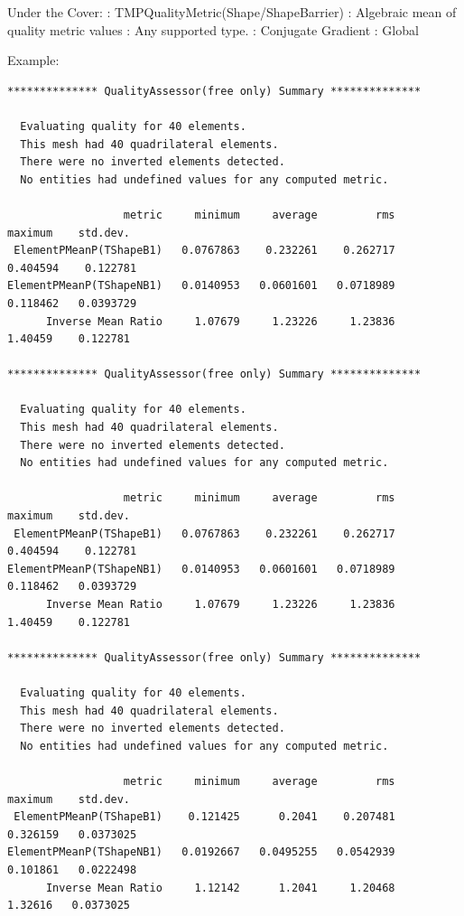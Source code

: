 \noindent Under the Cover: \newline
{}: TMPQualityMetric(Shape/ShapeBarrier) \newline
{}: Algebraic mean of quality metric values \newline
{}: Any supported type. \newline
{}: Conjugate Gradient \newline
{}: Global \newline

\noindent Example: \newline

\begin{verbatim}
************** QualityAssessor(free only) Summary **************

  Evaluating quality for 40 elements.
  This mesh had 40 quadrilateral elements.
  There were no inverted elements detected. 
  No entities had undefined values for any computed metric.

                  metric     minimum     average         rms     maximum    std.dev.
 ElementPMeanP(TShapeB1)   0.0767863    0.232261    0.262717    0.404594    0.122781
ElementPMeanP(TShapeNB1)   0.0140953   0.0601601   0.0718989    0.118462   0.0393729
      Inverse Mean Ratio     1.07679     1.23226     1.23836     1.40459    0.122781

************** QualityAssessor(free only) Summary **************

  Evaluating quality for 40 elements.
  This mesh had 40 quadrilateral elements.
  There were no inverted elements detected. 
  No entities had undefined values for any computed metric.

                  metric     minimum     average         rms     maximum    std.dev.
 ElementPMeanP(TShapeB1)   0.0767863    0.232261    0.262717    0.404594    0.122781
ElementPMeanP(TShapeNB1)   0.0140953   0.0601601   0.0718989    0.118462   0.0393729
      Inverse Mean Ratio     1.07679     1.23226     1.23836     1.40459    0.122781

************** QualityAssessor(free only) Summary **************

  Evaluating quality for 40 elements.
  This mesh had 40 quadrilateral elements.
  There were no inverted elements detected. 
  No entities had undefined values for any computed metric.

                  metric     minimum     average         rms     maximum    std.dev.
 ElementPMeanP(TShapeB1)    0.121425      0.2041    0.207481    0.326159   0.0373025
ElementPMeanP(TShapeNB1)   0.0192667   0.0495255   0.0542939    0.101861   0.0222498
      Inverse Mean Ratio     1.12142      1.2041     1.20468     1.32616   0.0373025
\end{verbatim}

